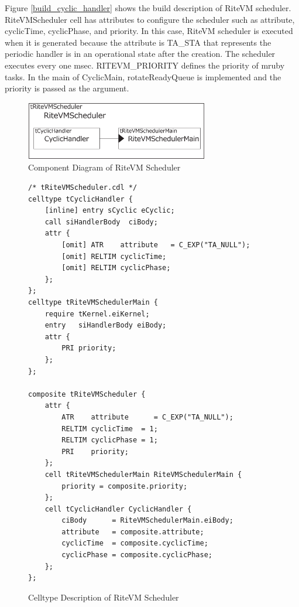 \documentclass{sig-alternate-05-2015}
\begin{document}
Figure \ref{build_cyclic_handler} shows the build description of RiteVM scheduler.
RiteVMScheduler {\myit cell} has attributes to configure the scheduler such as attribute, cyclicTime, cyclicPhase, and priority.
In this case, RiteVM scheduler is executed when it is generated because the attribute is {\myit TA\_STA} that represents the periodic handler is in an operational state after the creation.
The scheduler executes every one msec.
RITEVM\_PRIORITY defines the priority of mruby tasks.
In the main of CyclicMain, {\myit rotateReadyQueue} is implemented and the priority is passed as the argument.

\begin{figure}[t]
    \centering
    \includegraphics[width=8cm,clip]{figure/cyclic_handler.eps}
    \vspace{1mm}
\caption{Component Diagram of RiteVM Scheduler}
    \vspace{1mm}
\label{fig:cyclic_handler}
\end{figure}
\begin{figure}[t]
    \centering
    \begin{lstlisting}
/* tRiteVMScheduler.cdl */
celltype tCyclicHandler {
    [inline] entry sCyclic eCyclic;
    call siHandlerBody  ciBody;
    attr {
        [omit] ATR    attribute   = C_EXP("TA_NULL");
    	[omit] RELTIM cyclicTime;
    	[omit] RELTIM cyclicPhase;
    };
};
celltype tRiteVMSchedulerMain {
    require tKernel.eiKernel;
    entry   siHandlerBody eiBody;
    attr {
        PRI priority;
    };
};

composite tRiteVMScheduler {
    attr {
        ATR    attribute      = C_EXP("TA_NULL");
        RELTIM cyclicTime  = 1;
        RELTIM cyclicPhase = 1;
        PRI    priority;
    };
    cell tRiteVMSchedulerMain RiteVMSchedulerMain {
        priority = composite.priority;
    };
    cell tCyclicHandler CyclicHandler {
        ciBody      = RiteVMSchedulerMain.eiBody;
        attribute   = composite.attribute;
        cyclicTime  = composite.cyclicTime;
        cyclicPhase = composite.cyclicPhase;
    };
};
    \end{lstlisting}
    \vspace{1mm}
\caption{Celltype Description of RiteVM Scheduler}
    \vspace{1mm}
\label{celltype_cyclic_handler}
\end{figure}
\end{document}

